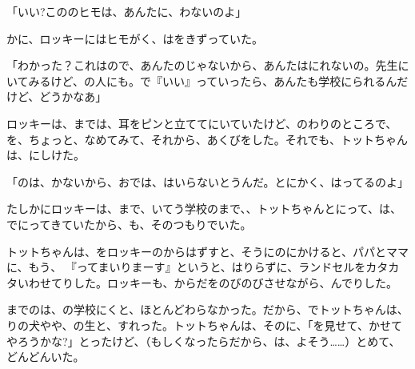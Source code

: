 「いい?こののヒモは、あんたに、わないのよ」

かに、ロッキーにはヒモがく、はをきずっていた。

「わかった？これはので、あんたのじゃないから、あんたはにれないの。先生にいてみるけど、の人にも。で『いい』っていったら、あんたも学校にられるんだけど、どうかなあ」

ロッキーは、までは、耳をピンと立ててにいていたけど、のわりのところで、を、ちょっと、なめてみて、それから、あくびをした。それでも、トットちゃんは、にしけた。

「のは、かないから、おでは、はいらないとうんだ。とにかく、はってるのよ」


たしかにロッキーは、まで、いてう学校のまで、、トットちゃんとにって、は、でにってきていたから、も、そのつもりでいた。

トットちゃんは、をロッキーのからはずすと、そうにのにかけると、パパとママに、もう、 『ってまいりまーす』というと、はりらずに、ランドセルをカタカタいわせてりした。ロッキーも、からだをのびのびさせながら、んでりした。

までのは、の学校にくと、ほとんどわらなかった。だから、でトットちゃんは、りの犬やや、の生と、すれった。トットちゃんは、そのに、「を見せて、かせてやろうかな?」とったけど、（もしくなったらだから、は、よそう……）とめて、どんどんいた。


